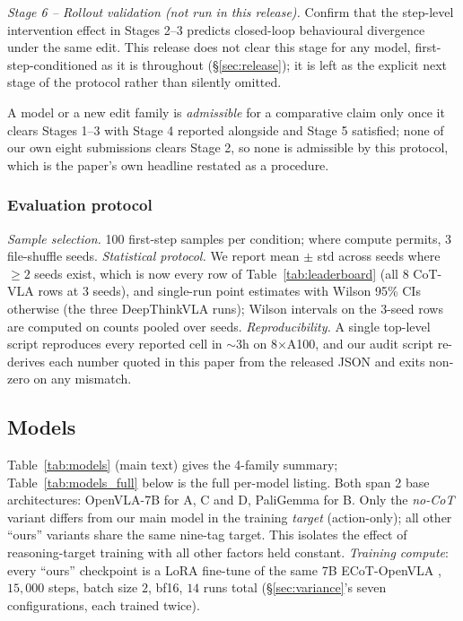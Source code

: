 \emph{Stage 6 -- Rollout validation (not run in this release).} Confirm that the step-level intervention effect in Stages 2--3 predicts closed-loop behavioural divergence under the same edit. This release does not clear this stage for any model, first-step-conditioned as it is throughout (\S\ref{sec:release}); it is left as the explicit next stage of the protocol rather than silently omitted.

A model or a new edit family is \emph{admissible} for a comparative claim only once it clears Stages 1--3 with Stage 4 reported alongside and Stage 5 satisfied; none of our own eight submissions clears Stage 2, so none is admissible by this protocol, which is the paper's own headline restated as a procedure.

\subsubsection{Evaluation protocol}
\label{sec:protocol_sampling}
\emph{Sample selection.} 100 first-step samples per condition; where compute permits, 3 file-shuffle seeds. \emph{Statistical protocol.} We report mean $\pm$ std across seeds where $\geq 2$ seeds exist, which is now every row of Table~\ref{tab:leaderboard} (all 8 CoT-VLA rows at 3 seeds), and single-run point estimates with Wilson 95\% CIs otherwise (the three DeepThinkVLA runs); Wilson intervals on the 3-seed rows are computed on counts pooled over seeds. \emph{Reproducibility.} A single top-level script reproduces every reported cell in $\sim$3h on 8$\times$A100, and our audit script re-derives each number quoted in this paper from the released JSON and exits non-zero on any mismatch.

\subsection{Models}
\label{sec:models}

Table~\ref{tab:models} (main text) gives the 4-family summary; Table~\ref{tab:models_full} below is the full per-model listing. Both span 2 base architectures: OpenVLA-7B for A, C and D, PaliGemma for B. Only the \emph{no-CoT} variant differs from our main model in the training \emph{target} (action-only); all other ``ours'' variants share the same nine-tag target. This isolates the effect of reasoning-target training with all other factors held constant. \emph{Training compute}: every ``ours'' checkpoint is a LoRA fine-tune of the same 7B ECoT-OpenVLA \citep{ecot}, $15{,}000$ steps, batch size $2$, bf16, $14$ runs total (\S\ref{sec:variance}'s seven configurations, each trained twice).

